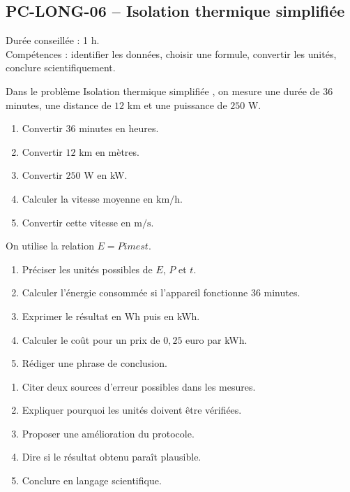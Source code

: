 \documentclass[11pt,a4paper]{article}
\newcounter{exercice}
\begin{document}
\subsection{PC-LONG-06 -- Isolation thermique simplifiée}

\begin{objectif}
Durée conseillée : 1 h.\\
Compétences : identifier les données, choisir une formule, convertir les unités, conclure scientifiquement.
\end{objectif}
\begin{exercice}
Dans le problème \og Isolation thermique simplifiée \fg, on mesure une durée de $36$ minutes, une distance de $12$ km et une puissance de $250$ W.
\begin{enumerate}
  \item Convertir $36$ minutes en heures.
  \item Convertir $12$ km en mètres.
  \item Convertir $250$ W en kW.
  \item Calculer la vitesse moyenne en $\mathrm{km/h}$.
  \item Convertir cette vitesse en $\mathrm{m/s}$.
\end{enumerate}
\end{exercice}

\begin{exercice}
On utilise la relation $E=P	imes t$.
\begin{enumerate}
  \item Préciser les unités possibles de $E$, $P$ et $t$.
  \item Calculer l'énergie consommée si l'appareil fonctionne $36$ minutes.
  \item Exprimer le résultat en Wh puis en kWh.
  \item Calculer le coût pour un prix de $0{,}25$ euro par kWh.
  \item Rédiger une phrase de conclusion.
\end{enumerate}
\end{exercice}

\begin{exercice}
\begin{enumerate}
  \item Citer deux sources d'erreur possibles dans les mesures.
  \item Expliquer pourquoi les unités doivent être vérifiées.
  \item Proposer une amélioration du protocole.
  \item Dire si le résultat obtenu paraît plausible.
  \item Conclure en langage scientifique.
\end{enumerate}
\end{exercice}
\newpage
\end{document}
